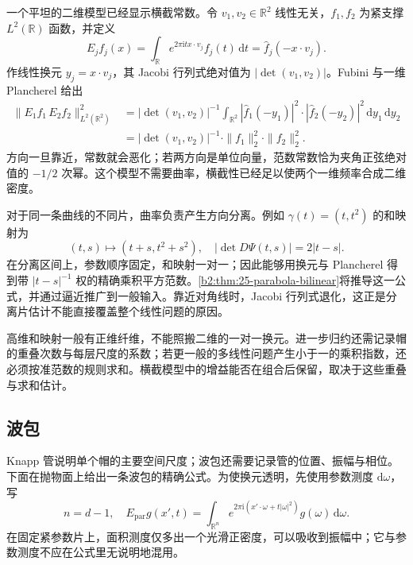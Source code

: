 一个平坦的二维模型已经显示横截常数。令 \(v_1,v_2\in\mathbb R^2\) 线性无关，\(f_1,f_2\) 为紧支撑 \(L^2(\mathbb R)\) 函数，并定义
\[
 E_jf_j(x)=\int_{\mathbb R}
       e^{2\pi\mathrm i t x\cdot v_j}f_j(t)\,\mathrm dt
       =\widehat f_j(-x\cdot v_j).
\]
作线性换元 \(y_j=x\cdot v_j\)，其 Jacobi 行列式绝对值为 \(|\det(v_1,v_2)|\)。Fubini 与一维 Plancherel 给出
\[
 \begin{aligned}
 \|E_1f_1\,E_2f_2\|_{L^2(\mathbb R^2)}^2
 &=|\det(v_1,v_2)|^{-1}
   \int_{\mathbb R^2}
      |\widehat f_1(-y_1)|^2\cdot|\widehat f_2(-y_2)|^2
      \,\mathrm dy_1\,\mathrm dy_2\\
 &=|\det(v_1,v_2)|^{-1}
      \cdot\|f_1\|_2^2\cdot\|f_2\|_2^2.
 \end{aligned}
\]
方向一旦靠近，常数就会恶化；若两方向是单位向量，范数常数恰为夹角正弦绝对值的 \(-1/2\) 次幂。这个模型不需要曲率，横截性已经足以使两个一维频率合成二维密度。

\ProseParagraphBreak
对于同一条曲线的不同片，曲率负责产生方向分离。例如 \(\gamma(t)=(t,t^2)\) 的和映射为
\[
 (t,s)\longmapsto(t+s,t^2+s^2),\quad
 |\det D\Psi(t,s)|=2|t-s|.
\]
在分离区间上，参数顺序固定，和映射一对一；因此能够用换元与 Plancherel 得到带 \(|t-s|^{-1}\) 权的精确乘积平方范数。\cref{b2:thm:25-parabola-bilinear}将推导这一公式，并通过逼近推广到一般输入。靠近对角线时，Jacobi 行列式退化，这正是分离片估计不能直接覆盖整个线性问题的原因。

高维和映射一般有正维纤维，不能照搬二维的一对一换元。进一步归约还需记录帽的重叠次数与每层尺度的系数；若更一般的多线性问题产生小于一的乘积指数，还必须按准范数的规则求和。横截模型中的增益能否在组合后保留，取决于这些重叠与求和估计。

\subsection{波包}
\label{b2:subsec:230603}

Knapp 管说明单个帽的主要空间尺度；波包还需要记录管的位置、振幅与相位。下面在抛物面上给出一条波包的精确公式。为使换元透明，先使用参数测度 \(\mathrm d\omega\)，写
\[
 n=d-1,\quad
 E_{\mathrm{par}}g(x',t)
 =\int_{\mathbb R^n}
       e^{2\pi\mathrm i(x'\cdot\omega+t|\omega|^2)}
       g(\omega)\,\mathrm d\omega.
\]
在固定紧参数片上，面积测度仅多出一个光滑正密度，可以吸收到振幅中；它与参数测度不应在公式里无说明地混用。

